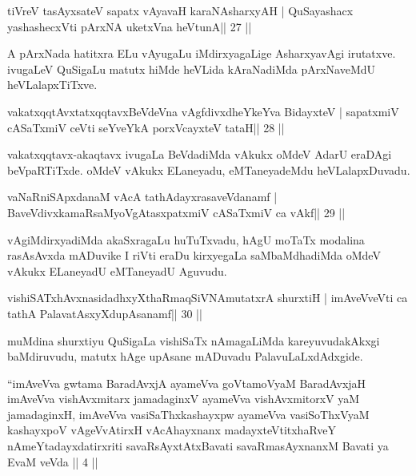 \begin{shl}
tiVreV tasAyx\s\s sateV sapatx vAyavaH karaNAsharxyAH |
QuSayashacx yashashecxVti pArxNA uketxVna heVtunA\hfill || 27 ||
\end{shl}

\begin{artha}
A pArxNada hatitxra ELu vAyugaLu iMdirxyagaLige AsharxyavAgi irutatxve. ivugaLeV QuSigaLu matutx hiMde heVLida kAraNadiMda pArxNaveMdU heVLalapxTiTxve.
\end{artha}

\begin{shl}
vakatxqqtAvxtatxqqtavxBeVdeVna vAgfdivxdheYkeYva BidayxteV |
sapatxmiV cASaTxmiV ceVti seYveYkA porxVcayxteV tataH\hfill || 28 ||
\end{shl}

\begin{artha}
vakatxqqtavx-akaqtavx ivugaLa BeVdadiMda vAkukx oMdeV AdarU eraDAgi beVpaRTiTxde. oMdeV vAkukx ELaneyadu, eMTaneyadeMdu heVLalapxDuvadu.
\end{artha}



\begin{shl}
vaNaRniSApxdanaM vAcA tathA\s\s dayxrasaveVdanamf |
BaveVdivxkamaRsaMyoVgAtasxpatxmiV cASaTxmiV ca vAkf\hfill || 29 ||
\end{shl}

\begin{artha}
vAgiMdirxyadiMda akaSxragaLu huTuTxvadu, hAgU moTaTx modalina rasAsAvxda mADuvike I riVti eraDu kirxyegaLa saMbaMdhadiMda oMdeV vAkukx ELaneyadU eMTaneyadU Aguvudu.
\end{artha}


\begin{shl}
vishiSATxhAvxnasidadhxyXthaRmaqSiVNAmutatxrA shurxtiH |
imAveVveVti ca tathA PalavatAsxyXdupAsanamf\hfill || 30 ||
\end{shl}

\begin{artha}
muMdina shurxtiyu QuSigaLa vishiSaTx nAmagaLiMda kareyuvudakAkxgi
baMdiruvudu, matutx hAge upAsane mADuvadu PalavuLaLxdAdxgide.
\end{artha}


{}

\begin{kandikeshl}
``imAveVva gwtama BaradAvxjA ayameVva goVtamoV\s yaM BaradAvxjaH
  imAveVva vishAvxmitarx jamadaginxV ayameVva vishAvxmitorxV\s
  yaM jamadaginxH, imAveVva vasiSaThxkashayxpw ayameVva vasiSoThxV\s yaM
  kashayxpoV vAgeVvAtirxH vAcAhayxnanx madayxteV\s titxhaRveY
  nAmeYtadayxdatirxriti savaRsAyxtAtxBavati savaRmasAyxnanxM Bavati
  ya EvaM veVda || 4 ||
\end{kandikeshl}


